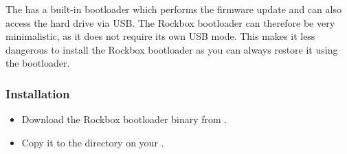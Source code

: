 The \playername{} has a built-in bootloader which performs the
firmware update and can also access the hard drive via USB.  The
Rockbox bootloader can therefore be very minimalistic, as it does not require
 its own USB mode.  This makes it less dangerous to install the Rockbox bootloader
 as you can always restore it using the \playerman{} bootloader.


\subsubsection{Installation}
\begin{itemize}
\item Download the Rockbox bootloader binary from 
.
\item Copy it to the  directory on your \dap{}.
\end{itemize}
